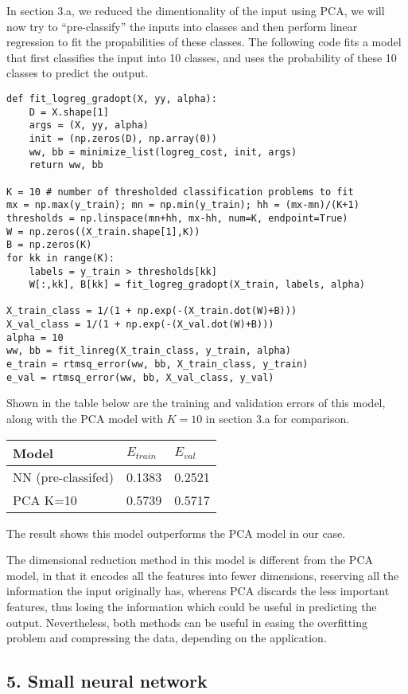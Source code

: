 \documentclass[11pt]{article}
\begin{document}
In section 3.a, we reduced the dimentionality of the input using PCA, we
will now try to ``pre-classify'' the inputs into classes and then
perform linear regression to fit the propabilities of these classes. The
following code fits a model that first classifies the input into 10
classes, and uses the probability of these 10 classes to predict the
output.

\begin{verbatim}
def fit_logreg_gradopt(X, yy, alpha):
    D = X.shape[1]
    args = (X, yy, alpha)
    init = (np.zeros(D), np.array(0))
    ww, bb = minimize_list(logreg_cost, init, args)
    return ww, bb

K = 10 # number of thresholded classification problems to fit
mx = np.max(y_train); mn = np.min(y_train); hh = (mx-mn)/(K+1)
thresholds = np.linspace(mn+hh, mx-hh, num=K, endpoint=True)
W = np.zeros((X_train.shape[1],K))
B = np.zeros(K)
for kk in range(K):
    labels = y_train > thresholds[kk]
    W[:,kk], B[kk] = fit_logreg_gradopt(X_train, labels, alpha)

X_train_class = 1/(1 + np.exp(-(X_train.dot(W)+B)))
X_val_class = 1/(1 + np.exp(-(X_val.dot(W)+B)))
alpha = 10
ww, bb = fit_linreg(X_train_class, y_train, alpha)
e_train = rtmsq_error(ww, bb, X_train_class, y_train)
e_val = rtmsq_error(ww, bb, X_val_class, y_val)
\end{verbatim}

Shown in the table below are the training and validation errors of this
model, along with the PCA model with \(K=10\) in section 3.a for
comparison.

\begin{longtable}[]{@{}lll@{}}
\toprule
Model & \(E_{train}\) & \(E_{val}\)\tabularnewline
\midrule
\endhead
NN (pre-classifed) & 0.1383 & 0.2521\tabularnewline
PCA K=10 & 0.5739 & 0.5717\tabularnewline
\bottomrule
\end{longtable}

The result shows this model outperforms the PCA model in our case.

The dimensional reduction method in this model is different from the PCA
model, in that it encodes all the features into fewer dimensions,
reserving all the information the input originally has, whereas PCA
discards the less important features, thus losing the information which
could be useful in predicting the output. Nevertheless, both methods can
be useful in easing the overfitting problem and compressing the data,
depending on the application.

\hypertarget{small-neural-network}{%
\subsection{5. Small neural network}\label{small-neural-network}}
\end{document}
